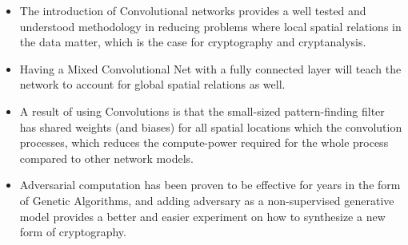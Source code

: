 \documentclass[12pt]{article}
\begin{document}
\begin{itemize}
	\item The introduction of Convolutional networks provides a well tested and understood methodology in reducing problems where local spatial relations in the data matter, which is the case for cryptography and cryptanalysis.
	\item Having a Mixed Convolutional Net with a fully connected layer will teach the network to account for global spatial relations as well.
	\item A result of using Convolutions is that the small-sized pattern-finding filter has shared weights (and biases) for all spatial locations which the convolution processes, which reduces the compute-power required for the whole process compared to other network models.
	\item Adversarial computation has been proven to be effective for years in the form of Genetic Algorithms, and adding adversary as a non-supervised generative model provides a better and easier experiment on how to synthesize a new form of cryptography.
\end{itemize}
\newpage
\end{document}
